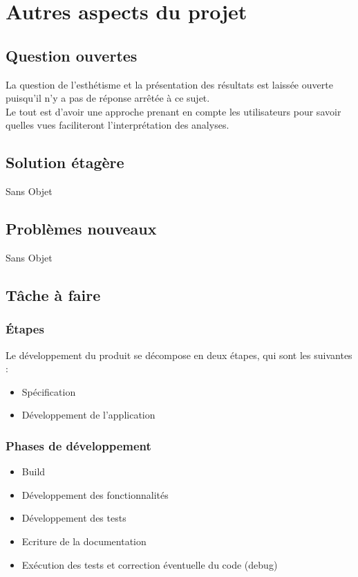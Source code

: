 		
	\section{Autres aspects du projet}
		\subsection{Question ouvertes}
			La question de l'esthétisme et la présentation des résultats est laissée ouverte puisqu'il n'y a pas de réponse arrêtée à ce sujet.\\
			Le tout est d'avoir une approche prenant en compte les utilisateurs pour savoir quelles vues faciliteront l'interprétation des analyses.
			
		\subsection{Solution étagère}
			Sans Objet
			
		\subsection{Problèmes nouveaux}
			Sans Objet
			
		\subsection{Tâche à faire}
			\subsubsection{Étapes}
			Le développement du produit se décompose en deux étapes, qui sont les suivantes :
				\begin{itemize}
				\item Spécification
				\item Développement de l'application
				\end{itemize}
				
			\subsubsection{Phases de développement}
				\begin{itemize}
				\item Build
				\item Développement des fonctionnalités
				\item Développement des tests
				\item Ecriture de la documentation
				\item Exécution des tests et correction éventuelle du code (debug)
				\end{itemize}
				
